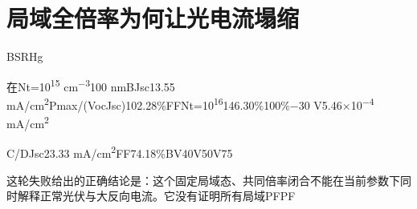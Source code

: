 \section{{\cjkfont 局域全倍率为何让光电流塌缩}\allowbreak{}}\label{sec:21}
B\allowbreak{}SRH\allowbreak{}g\allowbreak{}
\par
{\cjkfont 在}\allowbreak{}Nt=\allowbreak{}10\textsuperscript{15} cm\textsuperscript{−3}\allowbreak{}100 nm\allowbreak{}B\allowbreak{}Jsc\allowbreak{}13.55 mA/cm\textsuperscript{2}\allowbreak{}Pmax/(VocJsc)\allowbreak{}102.28\%\allowbreak{}FF\allowbreak{}Nt=\allowbreak{}10\textsuperscript{16}\allowbreak{}146.30\%\allowbreak{}100\%\allowbreak{}−30 V\allowbreak{}5.46\ensuremath{\times}10\textsuperscript{−4} mA/cm\textsuperscript{2}\allowbreak{}
\par
C/D\allowbreak{}Jsc\allowbreak{}23.33 mA/cm\textsuperscript{2}\allowbreak{}FF\allowbreak{}74.18\%\allowbreak{}B\allowbreak{}V40\allowbreak{}V50\allowbreak{}V75\allowbreak{}
\par
{\cjkfont 这轮失败给出的正确结论是：这个固定局域态、共同倍率闭合不能在当前参数下同时解释正常光伏与大反向电流。它没有证明所有局域}\allowbreak{}PF\allowbreak{}PF\allowbreak{}
